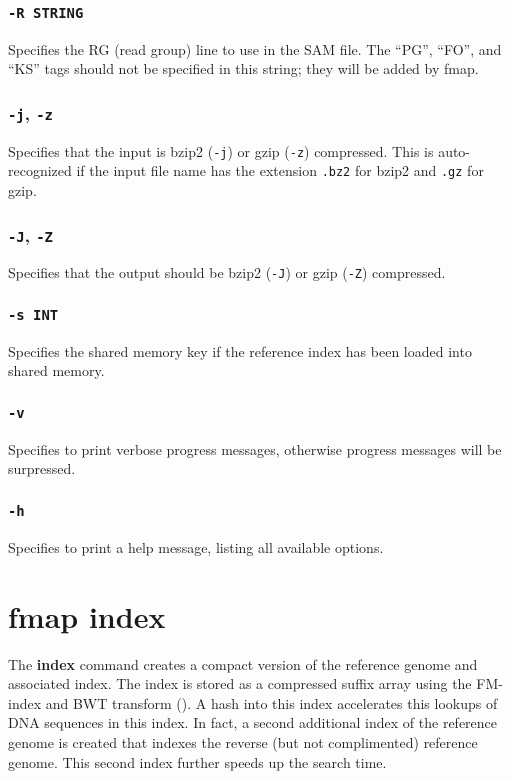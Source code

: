 \documentclass[a4paper,12pt]{book}
\newcommand{\TT}[1]{{\tt #1}} %
\newcommand{\BF}[1]{{\bf #1}} %
\begin{document}
\subsubsection{\TT{-R STRING}}
Specifies the RG (read group) line to use in the SAM file.
The ``PG'', ``FO'', and ``KS'' tags should not be specified in this string; they will be added by fmap.

\subsubsection{\TT{-j}, \TT{-z}}
Specifies that the input is bzip2 (\TT{-j}) or gzip (\TT{-z}) compressed.
This is auto-recognized if the input file name has the extension \TT{.bz2} for bzip2 and \TT{.gz} for gzip.

\subsubsection{\TT{-J}, \TT{-Z}}
Specifies that the output should be bzip2 (\TT{-J}) or gzip (\TT{-Z}) compressed.

\subsubsection{\TT{-s INT}}
Specifies the shared memory key if the reference index has been loaded into shared memory.

\subsubsection{\TT{-v}}
Specifies to print verbose progress messages, otherwise progress messages will be surpressed.

\subsubsection{\TT{-h}}
Specifies to print a help message, listing all available options.

\section{fmap index}
\label{sec:index}
The \BF{index} command creates a compact version of the reference genome and associated index.
The index is stored as a compressed suffix array using the FM-index and BWT transform (\cite{FM-index,BWT}).
A hash into this index accelerates this lookups of DNA sequences in this index.
In fact, a second additional index of the reference genome is created that indexes the reverse (but not complimented) reference genome.
This second index further speeds up the search time.
\end{document}
